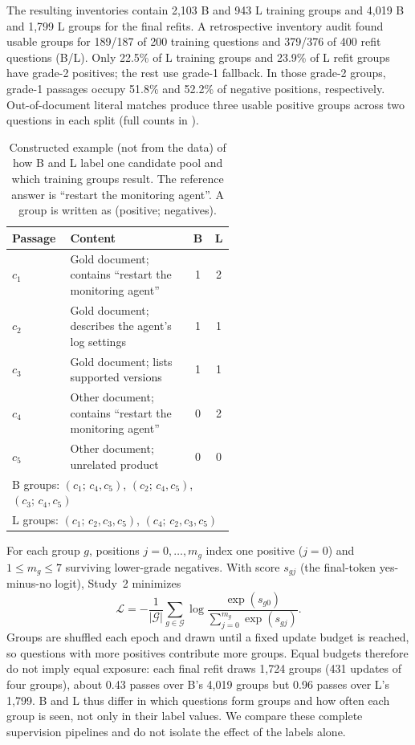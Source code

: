 The resulting inventories contain 2,103 B and 943 L training groups and 4,019 B and 1,799 L groups for the final refits. A retrospective inventory audit found usable groups for 189/187 of 200 training questions and 379/376 of 400 refit questions (B/L). Only 22.5\% of L training groups and 23.9\% of L refit groups have grade-2 positives; the rest use grade-1 fallback. In those grade-2 groups, grade-1 passages occupy 51.8\% and 52.2\% of negative positions, respectively. Out-of-document literal matches produce three usable positive groups across two questions in each split (full counts in ).
\begin{table}[htbp]\centering\small
\caption{Constructed example (not from the data) of how B and L label one candidate pool and which training groups result. The reference answer is ``restart the monitoring agent''. A group is written as (positive; negatives).}\label{tab:toy}
\begin{tabular}{lp{0.55\linewidth}cc}\toprule
Passage & Content & B & L\\\midrule
$c_1$ & Gold document; contains ``restart the monitoring agent'' & 1 & 2\\
$c_2$ & Gold document; describes the agent's log settings & 1 & 1\\
$c_3$ & Gold document; lists supported versions & 1 & 1\\
$c_4$ & Other document; contains ``restart the monitoring agent'' & 0 & 2\\
$c_5$ & Other document; unrelated product & 0 & 0\\\midrule
\multicolumn{4}{l}{B groups: $(c_1;\,c_4,c_5)$, $(c_2;\,c_4,c_5)$, $(c_3;\,c_4,c_5)$}\\
\multicolumn{4}{l}{L groups: $(c_1;\,c_2,c_3,c_5)$, $(c_4;\,c_2,c_3,c_5)$}\\\bottomrule
\end{tabular}\end{table}

For each group $g$, positions $j=0,\ldots,m_g$ index one positive ($j=0$) and $1\le m_g\le7$ surviving lower-grade negatives. With score $s_{gj}$ (the final-token yes-minus-no logit), Study~2 minimizes
\begin{equation}
 \mathcal L=-\frac{1}{|\mathcal G|}\sum_{g\in\mathcal G}\log\frac{\exp(s_{g0})}{\sum_{j=0}^{m_g}\exp(s_{gj})}.
\end{equation}
Groups are shuffled each epoch and drawn until a fixed update budget is reached, so questions with more positives contribute more groups. Equal budgets therefore do not imply equal exposure: each final refit draws 1,724 groups (431 updates of four groups), about 0.43 passes over B's 4,019 groups but 0.96 passes over L's 1,799. B and L thus differ in which questions form groups and how often each group is seen, not only in their label values. We compare these complete supervision pipelines and do not isolate the effect of the labels alone.

